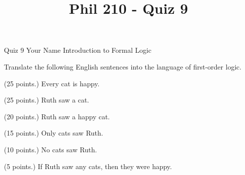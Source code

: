 
\title{Phil 210 - Quiz 9}

\heading
Quiz 9
Your Name
Introduction to Formal Logic
\endheading

Translate the following English sentences into the language of first-order logic.

\quantifiers
\problems
{} (25 points.)
Every cat is happy.
        \answer
        $ $
        \endanswer

 (25 points.)
Ruth saw a cat.
        \answer
        $ $
        \endanswer

 (20 points.)
Ruth saw a happy cat.
        \answer
        $ $
        \endanswer

 (15 points.)
Only cats saw Ruth.
        \answer
        $ $
        \endanswer

 (10 points.)
No cats saw Ruth.
        \answer
        $ $
        \endanswer

 (5 points.)
If Ruth saw any cats, then they were happy.
        \answer
        $ $
        \endanswer

\endproblems
\bye
